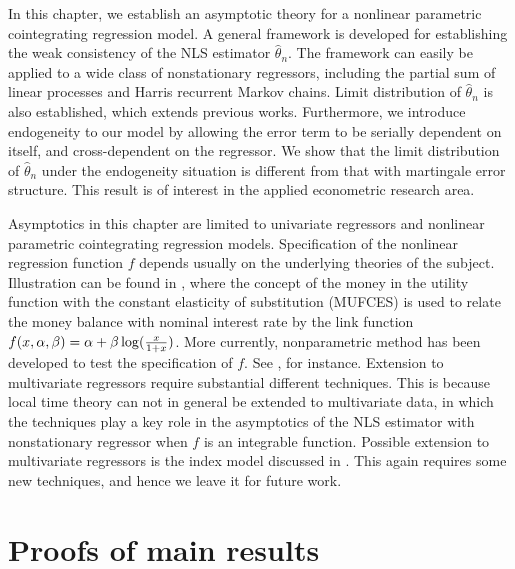 In this chapter, we establish an asymptotic theory for a nonlinear parametric cointegrating regression model. A general framework is developed for establishing the weak consistency of the NLS estimator $\hat{\theta}_n$. The framework can easily be applied to a wide class of nonstationary regressors, including the partial sum of linear processes and Harris recurrent Markov chains. Limit distribution of $\hat{\theta}_n$ is also established, which  extends previous works. Furthermore, we introduce endogeneity to our model by allowing the error term to be serially dependent on itself, and cross-dependent on the regressor. We show that the limit distribution of $\hat{\theta}_n$ under the endogeneity situation is different from that with martingale error structure. This result is of interest in the applied econometric research area. 

Asymptotics in this chapter are limited to univariate regressors and 
nonlinear parametric cointegrating regression models. Specification of the nonlinear regression function $f$ depends usually on the underlying theories of the subject. Illustration can be found in  \cite{baekakkarogaki2004}, where  the concept of the money in the utility function with the constant elasticity of substitution (MUFCES) is used  to relate the money balance with nominal interest rate by the link function $f(x, \alpha, \beta) = \alpha + \beta \log(\frac{x}{1 + x})$. More currently, nonparametric method
 has been developed to test the specification of $f$. See \cite{wangphillips2012},  for instance.
Extension to multivariate regressors require substantial different techniques. This is because  local time theory can not in general be extended to multivariate data, in which the techniques play a key role in  the asymptotics of the NLS estimator with nonstationary regressor when $f$ is an integrable function.   Possible extension to multivariate regressors is the index model discussed in \cite{changpark2003}. This again requires some new techniques, and hence we leave it for future  work.



\section{Proofs of main results} 

